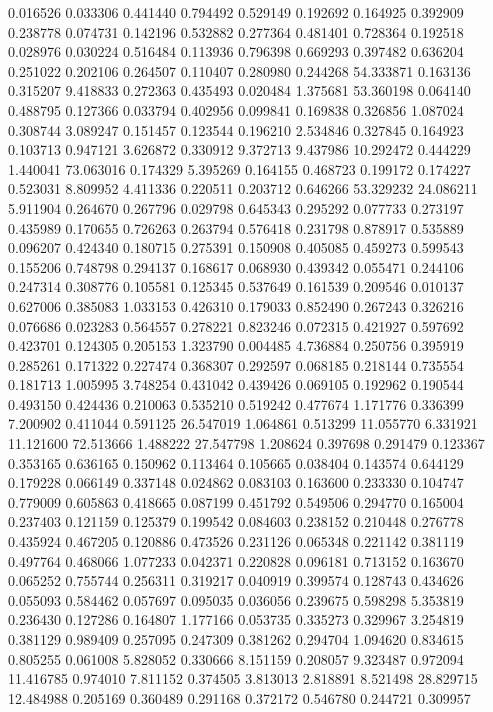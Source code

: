 0.016526
0.033306
0.441440
0.794492
0.529149
0.192692
0.164925
0.392909
0.238778
0.074731
0.142196
0.532882
0.277364
0.481401
0.728364
0.192518
0.028976
0.030224
0.516484
0.113936
0.796398
0.669293
0.397482
0.636204
0.251022
0.202106
0.264507
0.110407
0.280980
0.244268
54.333871
0.163136
0.315207
9.418833
0.272363
0.435493
0.020484
1.375681
53.360198
0.064140
0.488795
0.127366
0.033794
0.402956
0.099841
0.169838
0.326856
1.087024
0.308744
3.089247
0.151457
0.123544
0.196210
2.534846
0.327845
0.164923
0.103713
0.947121
3.626872
0.330912
9.372713
9.437986
10.292472
0.444229
1.440041
73.063016
0.174329
5.395269
0.164155
0.468723
0.199172
0.174227
0.523031
8.809952
4.411336
0.220511
0.203712
0.646266
53.329232
24.086211
5.911904
0.264670
0.267796
0.029798
0.645343
0.295292
0.077733
0.273197
0.435989
0.170655
0.726263
0.263794
0.576418
0.231798
0.878917
0.535889
0.096207
0.424340
0.180715
0.275391
0.150908
0.405085
0.459273
0.599543
0.155206
0.748798
0.294137
0.168617
0.068930
0.439342
0.055471
0.244106
0.247314
0.308776
0.105581
0.125345
0.537649
0.161539
0.209546
0.010137
0.627006
0.385083
1.033153
0.426310
0.179033
0.852490
0.267243
0.326216
0.076686
0.023283
0.564557
0.278221
0.823246
0.072315
0.421927
0.597692
0.423701
0.124305
0.205153
1.323790
0.004485
4.736884
0.250756
0.395919
0.285261
0.171322
0.227474
0.368307
0.292597
0.068185
0.218144
0.735554
0.181713
1.005995
3.748254
0.431042
0.439426
0.069105
0.192962
0.190544
0.493150
0.424436
0.210063
0.535210
0.519242
0.477674
1.171776
0.336399
7.200902
0.411044
0.591125
26.547019
1.064861
0.513299
11.055770
6.331921
11.121600
72.513666
1.488222
27.547798
1.208624
0.397698
0.291479
0.123367
0.353165
0.636165
0.150962
0.113464
0.105665
0.038404
0.143574
0.644129
0.179228
0.066149
0.337148
0.024862
0.083103
0.163600
0.233330
0.104747
0.779009
0.605863
0.418665
0.087199
0.451792
0.549506
0.294770
0.165004
0.237403
0.121159
0.125379
0.199542
0.084603
0.238152
0.210448
0.276778
0.435924
0.467205
0.120886
0.473526
0.231126
0.065348
0.221142
0.381119
0.497764
0.468066
1.077233
0.042371
0.220828
0.096181
0.713152
0.163670
0.065252
0.755744
0.256311
0.319217
0.040919
0.399574
0.128743
0.434626
0.055093
0.584462
0.057697
0.095035
0.036056
0.239675
0.598298
5.353819
0.236430
0.127286
0.164807
1.177166
0.053735
0.335273
0.329967
3.254819
0.381129
0.989409
0.257095
0.247309
0.381262
0.294704
1.094620
0.834615
0.805255
0.061008
5.828052
0.330666
8.151159
0.208057
9.323487
0.972094
11.416785
0.974010
7.811152
0.374505
3.813013
2.818891
8.521498
28.829715
12.484988
0.205169
0.360489
0.291168
0.372172
0.546780
0.244721
0.309957
